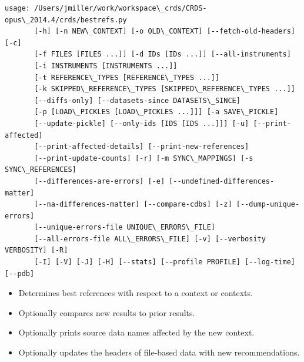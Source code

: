 \documentclass[letterpaper,10pt,english]{sphinxmanual}
\begin{document}
\begin{Verbatim}[commandchars=\\\{\}]
usage: /Users/jmiller/work/workspace\_crds/CRDS-opus\_2014.4/crds/bestrefs.py
       [-h] [-n NEW\_CONTEXT] [-o OLD\_CONTEXT] [--fetch-old-headers] [-c]
       [-f FILES [FILES ...]] [-d IDs [IDs ...]] [--all-instruments]
       [-i INSTRUMENTS [INSTRUMENTS ...]]
       [-t REFERENCE\_TYPES [REFERENCE\_TYPES ...]]
       [-k SKIPPED\_REFERENCE\_TYPES [SKIPPED\_REFERENCE\_TYPES ...]]
       [--diffs-only] [--datasets-since DATASETS\_SINCE]
       [-p [LOAD\_PICKLES [LOAD\_PICKLES ...]]] [-a SAVE\_PICKLE]
       [--update-pickle] [--only-ids [IDS [IDS ...]]] [-u] [--print-affected]
       [--print-affected-details] [--print-new-references]
       [--print-update-counts] [-r] [-m SYNC\_MAPPINGS] [-s SYNC\_REFERENCES]
       [--differences-are-errors] [-e] [--undefined-differences-matter]
       [--na-differences-matter] [--compare-cdbs] [-z] [--dump-unique-errors]
       [--unique-errors-file UNIQUE\_ERRORS\_FILE]
       [--all-errors-file ALL\_ERRORS\_FILE] [-v] [--verbosity VERBOSITY] [-R]
       [-I] [-V] [-J] [-H] [--stats] [--profile PROFILE] [--log-time] [--pdb]
\end{Verbatim}
\begin{itemize}
\item {} 
Determines best references with respect to a context or contexts.

\item {} 
Optionally compares new results to prior results.

\item {} 
Optionally prints source data names affected by the new context.

\item {} 
Optionally updates the headers of file-based data with new recommendations.

\end{itemize}
\end{document}
